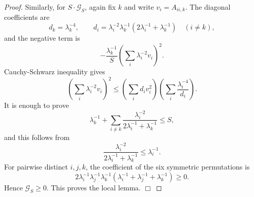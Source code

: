 \documentclass[10pt,a4paper]{amsart}
\begin{document}
\begin{proof}
Similarly, for $S\cdot\mathcal G_S$, again fix $k$ and write $v_i=A_{ii,k}$. The diagonal
coefficients are
\[
        d_k=\lambda_k^{-4},\qquad
        d_i=\lambda_i^{-2}\lambda_k^{-1}
        (2\lambda_i^{-1}+\lambda_k^{-1})\quad (i\ne k),
\]
and the negative term is
\[
        -\frac{\lambda_k^{-1}}{S}
        \left(\sum_i\lambda_i^{-2}v_i\right)^2.
\]
Cauchy-Schwarz inequality gives
\[
        \left(\sum_i\lambda_i^{-2}v_i\right)^2
        \leq \left(\sum_i d_i v_i^2\right)
        \left(\sum_i\frac{\lambda_i^{-4}}{d_i}\right).
\]
It is enough to prove
\[
        \lambda_k^{-1}
        +\sum_{i\ne k}
        \frac{\lambda_i^{-2}}{2\lambda_i^{-1}+\lambda_k^{-1}}
        \leq S,
\]
and this follows from
\[
        \frac{\lambda_i^{-2}}{2\lambda_i^{-1}+\lambda_k^{-1}}
        \leq \lambda_i^{-1}.
\]
For pairwise distinct $i,j,k$, the coefficient of the six symmetric
permutations is
\[
        2\lambda_i^{-1}\lambda_j^{-1}\lambda_k^{-1}
        (\lambda_i^{-1}+\lambda_j^{-1}+\lambda_k^{-1})\geq0.
\]
Hence $\mathcal G_S\geq0$. This proves the local lemma. \hfill$\Box$


\end{proof}
\end{document}
